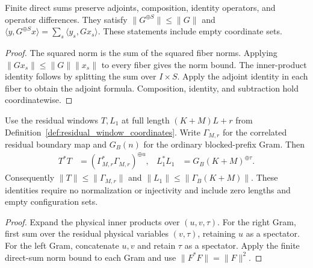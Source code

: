 \begin{lemma}
    \label{thm:euclidean_fiberwise_operator}
    \leanok
    Finite direct sums preserve adjoints, composition, identity operators, and
    operator differences. They satisfy
    $\lVert G^{\oplus S}\rVert\leq\lVert G\rVert$ and
    $\langle y,G^{\oplus S}x\rangle=\sum_s\langle y_s,Gx_s\rangle$.
    These statements include empty coordinate sets.
\end{lemma}
\begin{proof}\leanok
    The squared norm is the sum of the squared fiber norms. Applying
    $\lVert Gx_s\rVert\leq\lVert G\rVert\lVert x_s\rVert$ to every fiber gives
    the norm bound. The inner-product identity follows by splitting the sum
    over $I\times S$. Apply the adjoint identity in each fiber to obtain the
    adjoint formula. Composition, identity, and subtraction hold coordinatewise.
\end{proof}

\begin{lemma}
    \label{thm:residual_window_grams}
    \leanok
    Use the residual windows $T,L_1$ at full length $(K+M)L+r$ from
    Definition~\ref{def:residual_window_coordinates}. Write $\Gamma_{M,r}$
    for the correlated residual boundary map and $G_B(n)$ for the ordinary
    blocked-prefix Gram. Then
    \begin{align}
        T^*T     & =(\Gamma_{M,r}^*\Gamma_{M,r})^{\oplus u}, &
        L_1^*L_1 & =G_B(K+M)^{\oplus\tau}.
        \label{eq:ph_residual_window_grams}
    \end{align}
    Consequently $\lVert T\rVert\leq\lVert\Gamma_{M,r}\rVert$ and
    $\lVert L_1\rVert\leq\lVert\Gamma_B(K+M)\rVert$.
    These identities require no normalization or injectivity and include
    zero lengths and empty configuration sets.
\end{lemma}
\begin{proof}\leanok
    Expand the physical inner products over $(u,v,\tau)$.
    For the right Gram, first sum over the residual physical variables
    $(v,\tau)$, retaining $u$ as a spectator.
    For the left Gram, concatenate $u,v$ and retain $\tau$ as a spectator.
    Apply the finite direct-sum norm bound to each Gram and use
    $\lVert F^*F\rVert=\lVert F\rVert^2$.
\end{proof}

